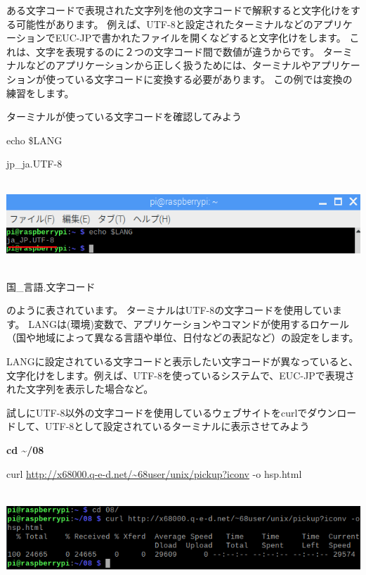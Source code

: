 \documentclass[a4paper,12pt,dvipdfmx]{jarticle}
\begin{document}
ある文字コードで表現された文字列を他の文字コードで解釈すると文字化けをする可能性があります。
例えば、UTF-8と設定されたターミナルなどのアプリケーションでEUC-JPで書かれたファイルを開くなどすると文字化けをします。
これは、文字を表現するのに２つの文字コード間で数値が違うからです。
ターミナルなどのアプリケーションから正しく扱うためには、ターミナルやアプリケーションが使っている文字コードに変換する必要があります。
この例では変換の練習をします。

ターミナルが使っている文字コードを確認してみよう

echo \$LANG

jp\_ja.UTF-8

\begin{center}
\includegraphics[width=17.006cm,height=3.231cm]{textbook-img019.png}

\end{center}
国\_言語.文字コード

のように表されています。
ターミナルはUTF-8の文字コードを使用しています。
LANGは(環境)変数で、アプリケーションやコマンドが使用するロケール（国や地域によって異なる言語や単位、日付などの表記など）の設定をします。


LANGに設定されている文字コードと表示したい文字コードが異なっていると、文字化けをします。例えば、UTF-8を使っているシステムで、EUC-JPで表現された文字列を表示した場合など。


試しにUTF-8以外の文字コードを使用しているウェブサイトをcurlでダウンロードして、UTF-8として設定されているターミナルに表示させてみよう

\textbf{cd \~{}/08}

curl \url{http://x68000.q-e-d.net/~68user/unix/pickup?iconv} -o hsp.html

\begin{center}
\includegraphics[width=17.006cm,height=3.53cm]{textbook-img020.png}

\end{center}
\end{document}
